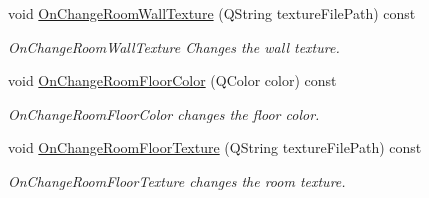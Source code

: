 \begin{DoxyCompactItemize}
void \hyperlink{class_home_designer_open_g_l_widget_ad249a6ddc83b3eb0d119af8b0a694cac}{On\+Change\+Room\+Wall\+Texture} (Q\+String texture\+File\+Path) const 
\begin{DoxyCompactList}\small\item\em On\+Change\+Room\+Wall\+Texture Changes the wall texture. \end{DoxyCompactList}\item 
void \hyperlink{class_home_designer_open_g_l_widget_abe86574fe0641dd2d564a7964bc5ee8d}{On\+Change\+Room\+Floor\+Color} (Q\+Color color) const 
\begin{DoxyCompactList}\small\item\em On\+Change\+Room\+Floor\+Color changes the floor color. \end{DoxyCompactList}\item 
void \hyperlink{class_home_designer_open_g_l_widget_a99fb72c11d0a5a748e7342535219bf6e}{On\+Change\+Room\+Floor\+Texture} (Q\+String texture\+File\+Path) const 
\begin{DoxyCompactList}\small\item\em On\+Change\+Room\+Floor\+Texture changes the room texture. \end{DoxyCompactList}\end{DoxyCompactItemize}
